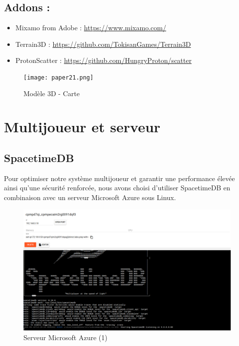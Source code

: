\documentclass[
	article,			%
	11pt,				%
	oneside,			%
	a4paper,			%
	chapter=TITLE,
	french,			%
	sumario=tradicional
	]{base_nt}
\begin{document}
\subsection{Addons :}

\begin{itemize}
    \item Mixamo from Adobe :  \url{https://www.mixamo.com/}
    \item Terrain3D :  \url{https://github.com/TokisanGames/Terrain3D}
    \item ProtonScatter :  \url{ https://github.com/HungryProton/scatter}
\end{itemize}

\begin{figure}[ht]
	\caption{Modèle 3D - Carte}
	\centering
	\texttt{[image: paper21.png]}
	\legend{}
	
\end{figure}

\newpage

\section{Multijoueur et serveur}

\subsection{SpacetimeDB}

Pour optimiser notre système multijoueur et garantir une performance élevée ainsi qu'une sécurité renforcée, nous avons choisi d'utiliser SpacetimeDB en combinaison avec un serveur Microsoft Azure sous Linux.

\begin{figure}[ht]
	\caption{Serveur Microsoft Azure (1)}
	\centering
	\includegraphics[width=1\linewidth]{paper12.png}
	\legend{}
	
\end{figure}
\end{document}
